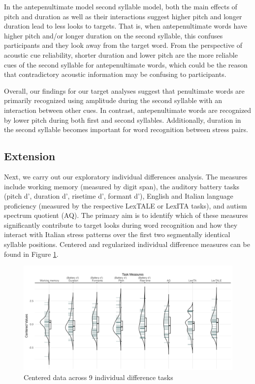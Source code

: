 In the antepenultimate model second syllable model, both the main effects of pitch and duration as well as their interactions suggest higher pitch and longer duration lead to less looks to targets. That is, when antepenultimate words have higher pitch and/or longer duration on the second syllable, this confuses participants and they look away from the target word. From the perspective of acoustic cue reliability, shorter duration and lower pitch are the more reliable cues of the second syllable for antepenultimate words, which could be the reason that contradictory acoustic information may be confusing to participants. 

Overall, our findings for our target analyses suggest that penultimate words are primarily recognized using amplitude during the second syllable with an interaction between other cues. In contrast, antepenultimate words are recognized by lower pitch during both first and second syllables. Additionally, duration in the second syllable becomes important for word recognition between stress pairs.

\subsection{Extension}

Next, we carry out our exploratory individual differences analysis. The measures include working memory (measured by digit span), the auditory battery tasks (pitch d', duration d', risetime d', formant d'), English and Italian language proficiency (measured by the respective LexTALE or LexITA tasks), and autism spectrum quotient (AQ). The primary aim is to identify which of these measures significantly contribute to target looks during word recognition and how they interact with Italian stress patterns over the first two segmentally identical syllable positions. Centered and regularized individual difference measures can be found in Figure \ref{fig:plot_raw_task}.

\begin{figure}[H]
  \centering
  \includegraphics[width=1\linewidth]{visuals/plot_raw_task.jpeg} %
  \caption{Centered data across 9 individual difference tasks}
  \label{fig:plot_raw_task}
\end{figure}


